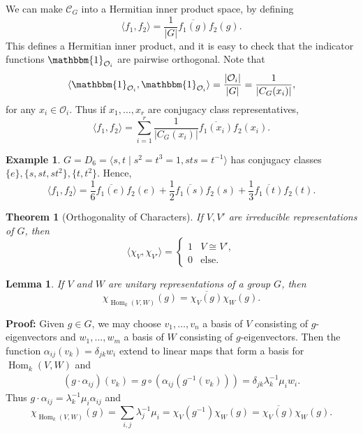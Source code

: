 \documentclass[12pt]{article}
\DeclareMathOperator{\Hom}{Hom}
\newtheorem{theorem}{Theorem}[section]
\newtheorem{lemma}{Lemma}[section]
\theoremstyle{definition}
\newtheorem{example}{Example}[section]
\theoremstyle{remark}
\begin{document}
We can make $\mathcal{C}_G$ into a Hermitian inner product space, by defining
\[
	\langle f_1, f_2 \rangle = \frac{1}{|G|} \overline{f_1(g)}f_2(g)
.\]
This defines a Hermitian inner product, and it is easy to check that the indicator functions $\mathbbm{1}_{\mathcal{O}_i}$ are pairwise orthogonal. Note that
\[
	\langle \mathbbm{1}_{\mathcal{O}_i}, \mathbbm{1}_{\mathcal{O}_i} \rangle = \frac{|\mathcal{O}_i|}{|G|} = \frac{1}{|C_G(x_i)|}
,\]
for any $x_i \in \mathcal{O}_i$. Thus if $x_1, \ldots, x_r$ are conjugacy class representatives,
\[
	\langle f_1, f_2 \rangle = \sum_{i = 1}^{r} \frac{1}{|C_G(x_i)|}\overline{f_1(x_i)}f_2(x_i)
.\]
\begin{adjustbox}{minipage = \columnwidth - 25.5pt, margin=1em, frame=1pt, margin=0em}
\begin{example}
	$G = D_6 = \langle s, t \mid s^2 = t^3 = 1, sts = t^{-1}\rangle$ has conjugacy classes $\{e\}, \{s, st, st^2\}, \{t, t^2\}$. Hence,
	\[
		\langle f_1, f_2 \rangle = \frac{1}{6}\overline{f_1(e)}f_2(e) + \frac{1}{2}\overline{f_1(s)}f_2(s) + \frac{1}{3}\overline{f_1(t)}f_2(t)
	.\]
\end{example}

\end{adjustbox}

\begin{theorem}[Orthogonality of Characters]
	If $V, V'$ are irreducible representations of $G$, then
	\[
		\langle \chi_V, \chi_{V'} \rangle =
		\begin{cases}
			1 & V \cong V', \\
			0 & \text{else}.
		\end{cases}
	\]
\end{theorem}

\begin{lemma}
	If $V$ and $W$ are unitary representations of a group $G$, then
	\[
		\chi_{\Hom_k(V, W)}(g) = \overline{\chi_V(g)}\chi_{W}(g)
	.\]
\end{lemma}

\begin{adjustbox}{minipage = \columnwidth - 25.5pt, margin=1em, frame=1pt, margin=0em}
	\textbf{Proof:} Given $g \in G$, we may choose $v_1, \ldots, v_n$ a basis of $V$ consisting of $g$-eigenvectors and $w_1, \ldots, w_m$ a basis of $W$ consisting of $g$-eigenvectors. Then the function $\alpha_{ij}(v_k) = \delta_{jk}w_i$ extend to linear maps that form a basis for $\Hom_k(V, W)$ and
	\begin{align*}
		(g \cdot \alpha_{ij})(v_k) = g \circ (\alpha_{ij}(g^{-1} (v_k))) = \delta_{jk}\lambda_k^{-1} \mu_i w_i.
	\end{align*}
	Thus $g \cdot \alpha_{ij} = \lambda_k^{-1} \mu_i \alpha_{ij}$ and
	\[
		\chi_{\Hom_k(V, W)}(g) = \sum_{i, j} \lambda_j^{-1} \mu_i = \chi_V(g^{-1}) \chi_W(g) = \overline{\chi_V(g)}\chi_W(g)
	.\]
\end{adjustbox}
\end{document}
